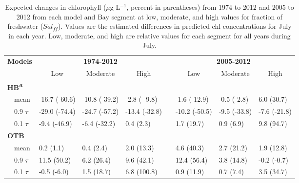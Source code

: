 \documentclass{svjour3}\usepackage[]{graphicx}\usepackage[]{color}
\newcommand{\mugl}{$\mu$g L$^{-1}$}
\begin{document}
%
\begin{table}[!tbp]
\caption{Expected changes in chlorophyll (\mugl, percent in parentheses) from 1974 to 2012 and 2005 to 2012 from each model and Bay segment at low, moderate, and high values for fraction of freshwater ($Sal_{ff}$).  Values are the estimated differences in predicted \ac{chl} concentrations for July in each year.  Low, moderate, and high are relative values for each segment for all years during July.\label{tab:trendest}} 
\begin{center}
\begin{tabular}{llllclll}
\hline\hline
\multicolumn{1}{l}{\bfseries {\bf Models}}&\multicolumn{3}{c}{\bfseries 1974-2012}&\multicolumn{1}{c}{\bfseries }&\multicolumn{3}{c}{\bfseries 2005-2012}\tabularnewline
\cline{2-4} \cline{6-8}
\multicolumn{1}{l}{}&\multicolumn{1}{c}{Low}&\multicolumn{1}{c}{Moderate}&\multicolumn{1}{c}{High}&\multicolumn{1}{c}{}&\multicolumn{1}{c}{Low}&\multicolumn{1}{c}{Moderate}&\multicolumn{1}{c}{High}\tabularnewline
\hline
{\bfseries HB\textsuperscript{\textit{a}}}&&&&&&&\tabularnewline
~~mean&-16.7 {\footnotesize (-60.6)}&-10.8 {\footnotesize (-39.2)}&-2.8 {\footnotesize ( -9.8)}&&-1.6 {\footnotesize (-12.9)}&-0.5 {\footnotesize (-2.8)}&6.0 {\footnotesize (30.7)}\tabularnewline
~~0.9 $\tau$&-29.0 {\footnotesize (-74.4)}&-24.7 {\footnotesize (-57.2)}&-13.4 {\footnotesize (-32.8)}&&-10.2 {\footnotesize (-50.5)}&-9.5 {\footnotesize (-33.8)}&-7.6 {\footnotesize (-21.8)}\tabularnewline
~~0.1 $\tau$&-9.4 {\footnotesize (-46.9)}&-6.4 {\footnotesize (-32.2)}&0.4 {\footnotesize (2.3)}&&1.7 {\footnotesize (19.7)}&0.9 {\footnotesize (6.9)}& 9.8 {\footnotesize (94.7)}\tabularnewline
\hline
{\bfseries OTB}&&&&&&&\tabularnewline
~~mean&0.2 {\footnotesize (1.1)}&0.4 {\footnotesize (2.4)}&2.0 {\footnotesize (13.3)}&&4.6 {\footnotesize (40.3)}&2.7 {\footnotesize (21.2)}&1.9 {\footnotesize (12.8)}\tabularnewline
~~0.9 $\tau$&11.5 {\footnotesize (50.2)}&6.2 {\footnotesize (26.4)}& 9.6 {\footnotesize (42.1)}&&12.4 {\footnotesize (56.4)}&3.8 {\footnotesize (14.8)}&-0.2 {\footnotesize (-0.7)}\tabularnewline
~~0.1 $\tau$&-0.5 {\footnotesize (-6.0)}&1.5 {\footnotesize (18.7)}&6.8 {\footnotesize (100.8)}&&0.9 {\footnotesize (11.9)}&0.7 {\footnotesize (7.4)}&3.5 {\footnotesize (34.7)}\tabularnewline

\end{tabular}
\end{center}
\end{table}
\end{document}
